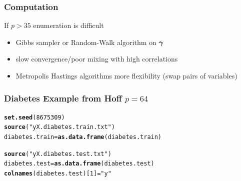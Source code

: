 \documentclass[]{beamer}\usepackage[]{graphicx}\usepackage[]{color}
\makeatletter
\newcommand{\hlnum}[1]{\textcolor[rgb]{0.686,0.059,0.569}{#1}}%
\newcommand{\hlstr}[1]{\textcolor[rgb]{0.192,0.494,0.8}{#1}}%
\newcommand{\hlstd}[1]{\textcolor[rgb]{0.345,0.345,0.345}{#1}}%
\newcommand{\hlkwb}[1]{\textcolor[rgb]{0.69,0.353,0.396}{#1}}%
\newcommand{\hlkwd}[1]{\textcolor[rgb]{0.737,0.353,0.396}{\textbf{#1}}}%
\newenvironment{kframe}{%
 \def\at@end@of@kframe{}%
 \ifinner\ifhmode%
  \def\at@end@of@kframe{\end{minipage}}%
  \begin{minipage}{\columnwidth}%
 \fi\fi%
 \def\FrameCommand##1{\hskip\@totalleftmargin \hskip-\fboxsep
 \colorbox{shadecolor}{##1}\hskip-\fboxsep
     \hskip-\linewidth \hskip-\@totalleftmargin \hskip\columnwidth}%
 \MakeFramed {\advance\hsize-\width
   \@totalleftmargin\z@ \linewidth\hsize
   \@setminipage}}%
 {\par\unskip\endMakeFramed%
 \at@end@of@kframe}
\newenvironment{knitrout}{}{} %
\makeatother
\begin{document}
\begin{frame}\frametitle{Computation}

If $p > 35$  enumeration is difficult

  \begin{itemize}
  \item Gibbs sampler or Random-Walk algorithm on $\boldsymbol{\gamma}$ \pause
  \item slow convergence/poor mixing with high correlations \pause
  \item Metropolis Hastings algorithms more flexibility \pause
        (swap pairs of variables)

\end{itemize}

\end{frame}


\begin{frame}[fragile] \frametitle{Diabetes Example from Hoff $p=64$ }

\begin{knitrout}
\color{fgcolor}\begin{kframe}
\begin{alltt}
\hlkwd{set.seed}\hlstd{(}\hlnum{8675309}\hlstd{)}
\hlkwd{source}\hlstd{(}\hlstr{"yX.diabetes.train.txt"}\hlstd{)}
\hlstd{diabetes.train} \hlkwb{=} \hlkwd{as.data.frame}\hlstd{(diabetes.train)}

\hlkwd{source}\hlstd{(}\hlstr{"yX.diabetes.test.txt"}\hlstd{)}
\hlstd{diabetes.test} \hlkwb{=} \hlkwd{as.data.frame}\hlstd{(diabetes.test)}
\hlkwd{colnames}\hlstd{(diabetes.test)[}\hlnum{1}\hlstd{]} \hlkwb{=} \hlstr{"y"}


\end{alltt}
\end{kframe}
\end{knitrout}
\end{frame}
\end{document}
